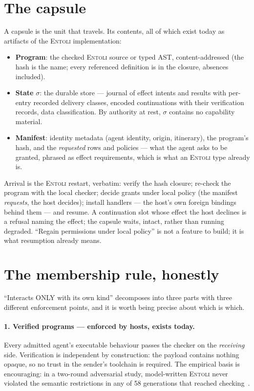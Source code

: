 \documentclass[sigplan,10pt]{acmart}
\begin{document}
\section{The capsule}

A capsule is the unit that travels. Its contents, all of which exist
today as artifacts of the \textsc{Entoli} implementation:

\begin{itemize}
\item \textbf{Program}: the checked \textsc{Entoli} source or typed AST,
  content-addressed (the hash is the name; every referenced definition is
  in the closure, absences included).
\item \textbf{State} $\sigma$: the durable store --- journal of effect
  intents and results with per-entry recorded delivery classes, encoded
  continuations with their verification records, data classification.
  By authority at rest, $\sigma$ contains no capability material.
\item \textbf{Manifest}: identity metadata (agent identity, origin,
  itinerary), the program's hash, and the \emph{requested} rows and
  policies --- what the agent asks to be granted, phrased as effect
  requirements, which is what an \textsc{Entoli} type already is.
\end{itemize}

Arrival is the \textsc{Entoli} restart, verbatim: verify the hash
closure; re-check the program with the local checker; decide grants
under local policy (the manifest \emph{requests}, the host decides);
install handlers --- the host's own foreign bindings behind them --- and
resume. A continuation slot whose effect the host declines is a refusal
naming the effect; the capsule waits, intact, rather than running
degraded. ``Regain permissions under local policy'' is not a feature to
build; it is what resumption already means.

\section{The membership rule, honestly}

``Interacts ONLY with its own kind'' decomposes into three parts with
three different enforcement points, and it is worth being precise about
which is which.

\paragraph{1. Verified programs — enforced by hosts, exists today.}
Every admitted agent's executable behaviour passes the checker on the
\emph{receiving} side. Verification is independent by construction: the
payload contains nothing opaque, so no trust in the sender's toolchain is
required. The empirical basis is encouraging: in a two-round adversarial
study, model-written \textsc{Entoli} never violated the semantic
restrictions in any of 58 generations that reached
checking~\cite{entoli2026}.
\end{document}
